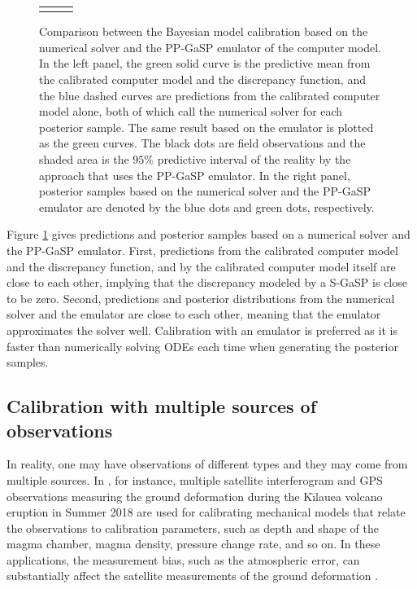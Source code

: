 \begin{figure}[t]
\begin{tabular}{ccc}
\vspace{-.2in}
\end{tabular}
   \caption{Comparison between the Bayesian model calibration based on the numerical solver and the PP-GaSP emulator of the computer model. In the left panel, the green solid curve is the predictive mean from the calibrated computer model and the discrepancy function, and the {blue} dashed curves are predictions from the calibrated computer model alone, both of which call the numerical solver for each posterior sample. The same result based on the emulator is plotted as  the {green}  curves. The black dots are field observations and the shaded area is the  $95\%$ predictive interval of the reality by the approach that uses the PP-GaSP emulator. In the right panel,   posterior samples based on the numerical solver and the PP-GaSP emulator are denoted by the {blue}  dots and {green}   dots, respectively.    }
 \label{fig:box_model}
\end{figure}

Figure \ref{fig:box_model} gives predictions and posterior samples based on a numerical solver and the PP-GaSP emulator. First, predictions from the calibrated computer model and the discrepancy function, and by the calibrated computer model itself are close to each other, implying that the discrepancy modeled by a S-GaSP is close to be zero. 
Second, predictions and posterior distributions from the numerical solver and  the emulator are close to each other, meaning that the emulator approximates the solver well.  {Calibration with an emulator is preferred as it is faster than numerically solving ODEs each time when generating the posterior samples}. 

\subsection{Calibration with multiple sources of observations}
In reality, one may have observations of different types and they may come from multiple sources.  In \cite{anderson2019magma}, for instance, multiple satellite interferogram and GPS observations measuring the ground deformation during the K\={\i}lauea volcano eruption in Summer 2018 are used for calibrating mechanical models that relate the observations to calibration parameters, such as depth and shape of the magma chamber, magma density, pressure change rate, and so on. In these applications, the measurement bias, such as the atmospheric error, can substantially affect the satellite measurements of the ground deformation \citep{Zebker1997,agram2015noise}. 


